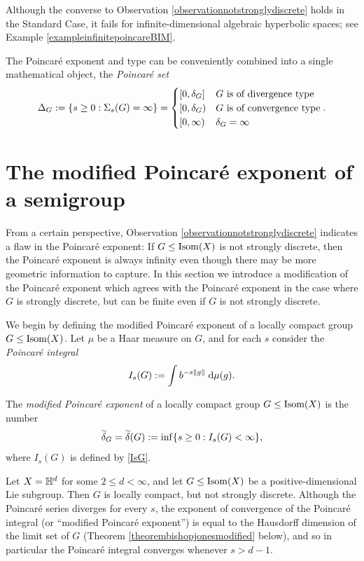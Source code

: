\begin{remark}
Although the converse to Observation \ref{observationnotstronglydiscrete} holds in the Standard Case, it fails for infinite-dimensional algebraic hyperbolic spaces; see Example \ref{exampleinfinitepoincareBIM}.
\end{remark}

\begin{notation}
\label{notationpoincareset}
The Poincar\'e exponent and type can be conveniently combined into a single mathematical object, the \emph{Poincar\'e set}
\[
\Delta_G := \{s\geq 0 : \Sigma_s(G) = \infty\} = \begin{cases}
[0,\delta_G] & \text{$G$ is of divergence type}\\
\CO 0{\delta_G} & \text{$G$ is of convergence type}\\
\Rplus & \delta_G = \infty
\end{cases}.
\]
\end{notation}

\section{The modified Poincar\'e exponent of a semigroup}
\label{subsectionmodified}

From a certain perspective, Observation \ref{observationnotstronglydiscrete} indicates a flaw in the Poincar\'e exponent: If $G\leq\operatorname{Isom}(X)$ is not strongly discrete, then the Poincar\'e exponent is always infinity even though there may be more geometric information to capture. In this section we introduce a modification of the Poincar\'e exponent which agrees with the Poincar\'e exponent in the case where $G$ is strongly discrete, but can be finite even if $G$ is not strongly discrete.

We begin by defining the modified Poincar\'e exponent of a locally compact group $G\leq\operatorname{Isom}(X)$. Let $\mu$ be a Haar measure on $G$, and for each $s$ consider the \emph{Poincar\'e integral}
\begin{equation}
\label{IsG}
I_s(G) := \int b^{-s\|g\|}\;\mathrm{d}\mu(g).
\end{equation}
\begin{definition}
\label{definitionmodified1}
The \emph{modified Poincar\'e exponent} of a locally compact group $G\leq\operatorname{Isom}(X)$ is the number
\[
\widetilde\delta_G = \widetilde\delta(G) := \inf\{s\geq 0: I_s(G) < \infty\},
\]
where $I_s(G)$ is defined by \eqref{IsG}.
\end{definition}
\begin{example}
\label{exampleLie}
Let $X = \H^d$ for some $2\leq d < \infty$, and let $G\leq\operatorname{Isom}(X)$ be a positive-dimensional Lie subgroup. Then $G$ is locally compact, but not strongly discrete. Although the Poincar\'e series diverges for every $s$, the exponent of convergence of the Poincar\'e integral (or ``modified Poincar\'e exponent'') is equal to the Hausdorff dimension of the limit set of $G$ (Theorem \ref{theorembishopjonesmodified} below), and so in particular the Poincar\'e integral converges whenever $s > d - 1$.
\end{example}

